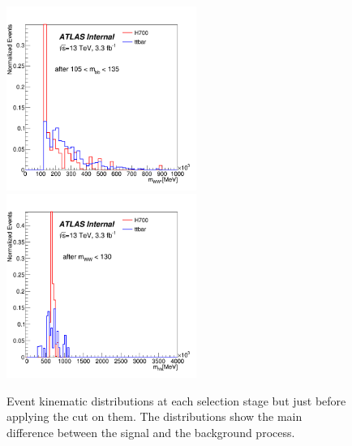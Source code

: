 \begin{figure}[h!]
\begin{center}
		\includegraphics[height=60mm]{figures/kinAtEachSel700/SR_opt700_bbpt150_drbb09_drww09_mbb_WWMass.png} 
		\includegraphics[height=60mm]{figures/kinAtEachSel700/SR_opt700_bbpt150_drbb09_drww09_mbb_mww_hhMass.png} 
	\caption{Event  kinematic distributions at each selection stage but just before applying the cut on them. The distributions show the main difference between the signal and the background process.}
	\label{fig:kinAtEachSel700}
	\end{center}    
\end{figure}